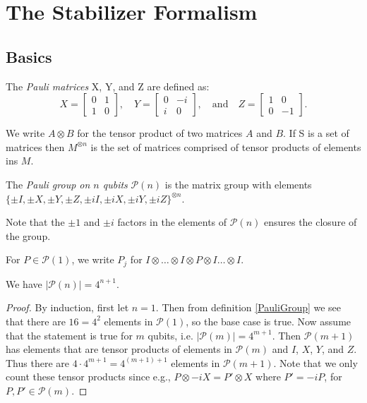 \documentclass[12pt]{dalthesis}
\begin{document}
\chapter{The Stabilizer Formalism}
\label{chap Stab}
\section{Basics}

\begin{definition}
The \emph{Pauli matrices} X, Y, and Z are defined as:
  \[
  X= \begin{bmatrix}
    0 & 1 \\
    1 & 0
  \end{bmatrix}, \quad
  Y = \begin{bmatrix}
  0 & -i \\
  i & 0
  \end{bmatrix}, \quad \mbox{and} \quad
  Z = \begin{bmatrix}
  1 & 0 \\
  0 & -1
  \end{bmatrix}.
  \]
\end{definition}

We write $A \otimes B$ for the tensor product of two matrices $A$ and $B$. If S is a set of matrices then $M^{\otimes n}$ is the set of matrices comprised of tensor products of elements ins $M$.

\begin{definition}
\label{PauliGroup}
The \emph{Pauli group on $n$ qubits} $\mathcal{P}(n)$ is the matrix group with elements $\{ \pm I, \pm X, \pm Y, \pm Z, \pm iI, \pm iX, \pm iY, \pm iZ \}^{\otimes n}$.
\end{definition}

Note that the $\pm 1$ and $\pm i$ factors in the elements of $\mathcal{P}(n)$ ensures the closure of the group.

\begin{definition}
For $P \in \mathcal{P}(1)$, we write $P_j$ for $I \otimes \dots \otimes I \otimes P \otimes I \dots \otimes I$.
\end{definition}

\begin{proposition}
We have $|\mathcal{P}(n)|=4^{n+1}$.
\end{proposition}

\begin{proof}
By induction, first let $n=1$. Then from definition \ref{PauliGroup} we see that there are $16 = 4^2$ elements in $\mathcal{P}(1)$, so the base case is true. Now assume that the statement is true for $m$ qubits, i.e. $|\mathcal{P}(m)| = 4^{m+1}$. Then $\mathcal{P}(m+1)$ has elements that are tensor products of elements in $\mathcal{P}(m)$ and $I$, $X$, $Y$, and $Z$. Thus there are $4 \cdot 4^{m+1} = 4^{(m+1)+1}$ elements in $\mathcal{P}(m+1)$. Note that we only count these tensor products since e.g., $P \otimes -iX = P' \otimes X$ where $P' = -iP$, for $P, P' \in \mathcal{P}(m)$.
\end{proof}
\end{document}
